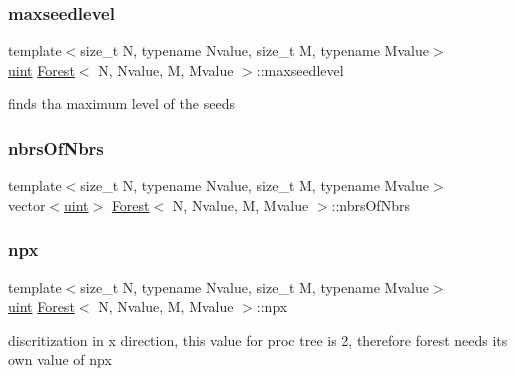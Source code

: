 \subsubsection{\texorpdfstring{maxseedlevel}{maxseedlevel}}
{\footnotesize\ttfamily template$<$size\+\_\+t N, typename Nvalue, size\+\_\+t M, typename Mvalue$>$ \\
\mbox{\hyperlink{definitions_8h_a69aa29b598b851b0640aa225a9e5d61d}{uint}} \mbox{\hyperlink{classForest}{Forest}}$<$ N, Nvalue, M, Mvalue $>$\+::maxseedlevel\hspace{0.3cm}{\ttfamily [private]}}

finds tha maximum level of the seeds \mbox{\label{classForest_a7e4badd955dbb535328dc18b3c782d3d}} 
\subsubsection{\texorpdfstring{nbrs\+Of\+Nbrs}{nbrsOfNbrs}}
{\footnotesize\ttfamily template$<$size\+\_\+t N, typename Nvalue, size\+\_\+t M, typename Mvalue$>$ \\
vector$<$\mbox{\hyperlink{definitions_8h_a69aa29b598b851b0640aa225a9e5d61d}{uint}}$>$ \mbox{\hyperlink{classForest}{Forest}}$<$ N, Nvalue, M, Mvalue $>$\+::nbrs\+Of\+Nbrs\hspace{0.3cm}{\ttfamily [private]}}

\mbox{\label{classForest_a9e1897b90013d70653bcc63c2b5b4589}} 
\subsubsection{\texorpdfstring{npx}{npx}}
{\footnotesize\ttfamily template$<$size\+\_\+t N, typename Nvalue, size\+\_\+t M, typename Mvalue$>$ \\
\mbox{\hyperlink{definitions_8h_a69aa29b598b851b0640aa225a9e5d61d}{uint}} \mbox{\hyperlink{classForest}{Forest}}$<$ N, Nvalue, M, Mvalue $>$\+::npx\hspace{0.3cm}{\ttfamily [protected]}}

discritization in x direction, this value for proc tree is 2, therefore forest needs its own value of npx \mbox{\label{classForest_a740e557b1d91cef196761afb65a6dc30}} 
